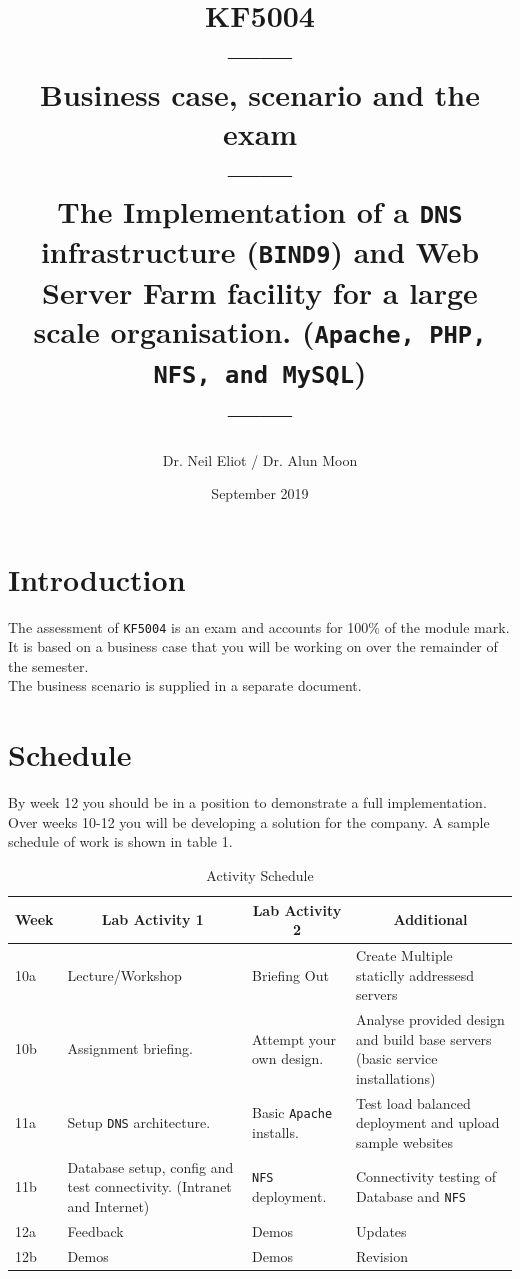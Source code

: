 \documentclass[11pt]{article}
\begin{document}
\author{Dr. Neil Eliot / Dr. Alun Moon}
\title{KF5004\\------\\Business case, scenario and the exam\\------\\The Implementation of a \texttt{DNS} infrastructure (\texttt{BIND9}) 
and Web Server Farm facility for a large scale organisation.
(\texttt{Apache, PHP, NFS, and MySQL})\\------}
\date{September 2019}
\maketitle

\newpage
\tableofcontents
\newpage

\section{Introduction}
The assessment of \texttt{KF5004} is an exam and accounts for 100\% of the module mark. It is based on a business case that you will be working on 
over the remainder of the semester.\\

\noindent The business scenario is supplied in a separate document. 

\section{Schedule}
By week 12 you should be in a position to demonstrate a full implementation. Over weeks 10-12 you will be developing a solution for the company. 
A sample schedule of work is shown in table 1.

\begin{table}[ht]\label{schedule}
    \begin{tabular}{|p{1cm}|p{5cm}|p{5cm}|p{5cm}|} 
      \hline
      \multicolumn{1}{|c|}{Week} & \multicolumn{1}{|c|}{Lab Activity 1} & \multicolumn{1}{|c|}{Lab Activity 2}& \multicolumn{1}{|c|}{Additional} \\ 
      \hline
      10a & Lecture/Workshop& Briefing Out & Create Multiple staticlly addressesd servers\\
      \hline
      10b & Assignment briefing.& Attempt your own design.& Analyse provided design and build base servers (basic service installations)\\
      \hline
      11a & Setup \texttt{DNS} architecture.& Basic \texttt{Apache} installs. & Test load balanced deployment and upload sample websites\\
      \hline
      11b & Database setup, config and test connectivity. (Intranet and Internet)& \texttt{NFS} deployment.& Connectivity testing of Database and \texttt{NFS}\\
      \hline
      12a & Feedback & Demos & Updates\\
      \hline
      12b & Demos & Demos & Revision\\
      \hline
    \end{tabular}
    \caption{Activity Schedule}
\end{table}
\newpage 
\end{document}
